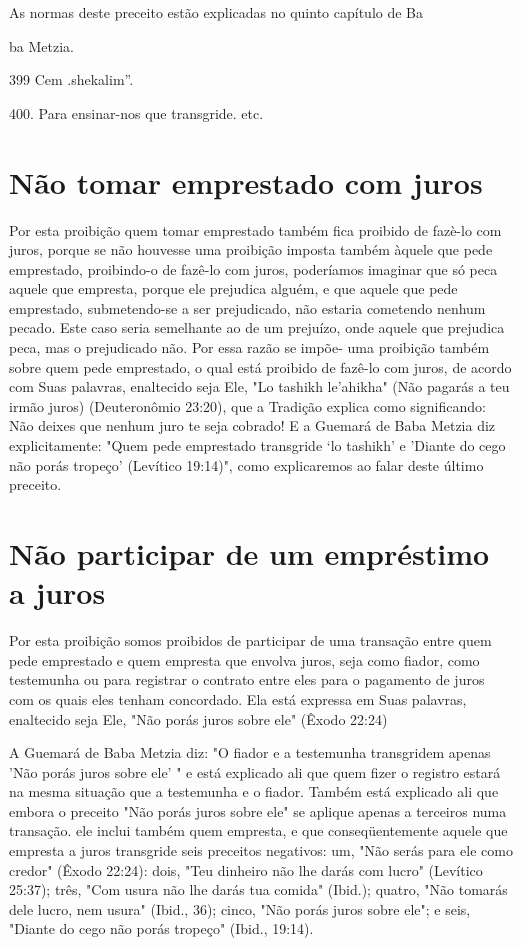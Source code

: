 \begin{itemize}
\begin{enumrate}
\begin{itemize}
\begin{itemize}
\begin{itemize}
As normas deste preceito estão explicadas no quinto capítulo de Ba


ba Metzia.

399 Cem .shekalim''.

400. Para ensinar-nos que transgride. etc.

\section{Não tomar emprestado com juros}

Por esta proibição quem tomar emprestado também fica proibido de fazè-lo
com juros, porque se não houvesse uma proibição imposta também àquele
que pede emprestado, proibindo-o de fazê-lo com juros, poderíamos
imaginar que só peca aquele que empresta, porque ele prejudica alguém, e
que aquele que pede emprestado, submetendo-se a ser prejudicado, não
estaria co­metendo nenhum pecado. Este caso seria semelhante ao de um
prejuízo, onde aquele que prejudica peca, mas o prejudicado não. Por
essa razão se impõe- uma proibição também sobre quem pede emprestado, o
qual está proibido de fazê-lo com juros, de acordo com Suas palavras,
enaltecido seja Ele, "Lo tashikh le'ahikha" (Não pagarás a teu irmão
juros) (Deuteronômio 23:20), que a Tradi­ção explica como significando:
Não deixes que nenhum juro te seja cobrado! E a Guemará de Baba Metzia
diz explicitamente: "Quem pede emprestado trans­gride `lo tashikh' e
'Diante do cego não porás tropeço' (Levítico 19:14)", como explicaremos
ao falar deste último preceito.

\section{Não participar de um empréstimo a juros}

Por esta proibição somos proibidos de participar de uma transação entre
quem pede emprestado e quem empresta que envolva juros, seja como
fiador, como testemunha ou para registrar o contrato entre eles para o
paga­mento de juros com os quais eles tenham concordado. Ela está
expressa em Suas palavras, enaltecido seja Ele, "Não porás juros sobre
ele" (Êxodo 22:24)

A Guemará de Baba Metzia diz: "O fiador e a testemunha transgri­dem
apenas 'Não porás juros sobre ele' " e está explicado ali que quem fizer
o registro estará na mesma situação que a testemunha e o fiador. Também
está explicado ali que embora o preceito "Não porás juros sobre ele" se
aplique apenas a terceiros numa transação. ele inclui também quem
empresta, e que conseqüentemente aquele que empresta a juros transgride
seis preceitos nega­tivos: um, "Não serás para ele como credor" (Êxodo
22:24): dois, "Teu dinhei­ro não lhe darás com lucro" (Levítico 25:37);
três, "Com usura não lhe darás tua comida" (Ibid.); quatro, "Não tomarás
dele lucro, nem usura" (Ibid., 36); cinco, "Não porás juros sobre ele";
e seis, "Diante do cego não porás tropeço" (Ibid., 19:14).


\end{itemize}
\end{itemize}
\end{itemize}
\end{enumrate}
\end{itemize}
